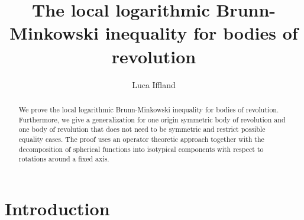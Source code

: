 \documentclass[12pt,twoside]{amsart}
\numberwithin{satz}{section}
\theoremstyle{definition}
\numberwithin{equation}{section}
\begin{document}
	\title[local log-Brunn-Minkowski inequality for bodies of revolution]{The local logarithmic Brunn-Minkowski inequality for bodies of revolution}
	\author{Luca Iffland}
	\address{Institut f\"ur Mathematik \newline%
		\indent Goethe-Universit\"at Frankfurt \newline%
		\indent Robert-Mayer-Str. 10, 60325 Frankfurt am Main, Germany}
	
	\begin{abstract}
		We prove the local logarithmic Brunn-Minkowski inequality for bodies of revolution. Furthermore, we give a generalization for one origin symmetric body of revolution and one body of revolution that does not need to be symmetric and restrict possible equality cases. The proof uses an operator theoretic approach together with the decomposition of spherical functions into isotypical components with respect to rotations around a fixed axis.
	\end{abstract}
	
	\maketitle
	
	\tableofcontents
	
	\thispagestyle{empty}
	
	\section{Introduction}
	
\end{document}
